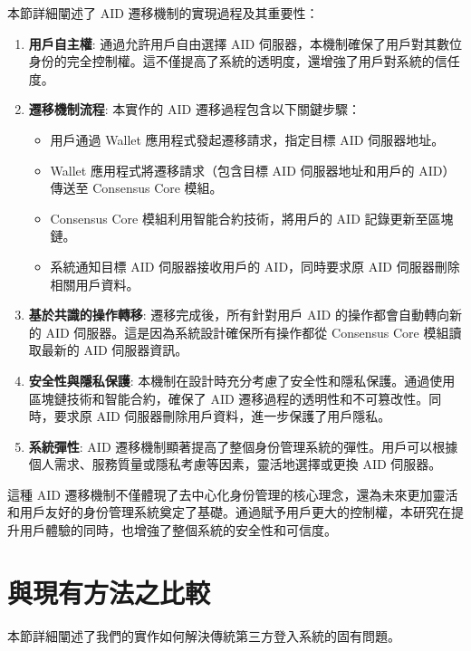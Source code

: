 本節詳細闡述了 AID 遷移機制的實現過程及其重要性：

\begin{enumerate}
  \item \textbf{用戶自主權}: 通過允許用戶自由選擇 AID 伺服器，本機制確保了用戶對其數位身份的完全控制權。這不僅提高了系統的透明度，還增強了用戶對系統的信任度。

  \item \textbf{遷移機制流程}: 本實作的 AID 遷移過程包含以下關鍵步驟：
        \begin{itemize}
          \item 用戶通過 Wallet 應用程式發起遷移請求，指定目標 AID 伺服器地址。
          \item Wallet 應用程式將遷移請求（包含目標 AID 伺服器地址和用戶的 AID）傳送至 Consensus Core 模組。
          \item Consensus Core 模組利用智能合約技術，將用戶的 AID 記錄更新至區塊鏈。
          \item 系統通知目標 AID 伺服器接收用戶的 AID，同時要求原 AID 伺服器刪除相關用戶資料。
        \end{itemize}

  \item \textbf{基於共識的操作轉移}: 遷移完成後，所有針對用戶 AID 的操作都會自動轉向新的 AID 伺服器。這是因為系統設計確保所有操作都從 Consensus Core 模組讀取最新的 AID 伺服器資訊。

  \item \textbf{安全性與隱私保護}: 本機制在設計時充分考慮了安全性和隱私保護。通過使用區塊鏈技術和智能合約，確保了 AID 遷移過程的透明性和不可篡改性。同時，要求原 AID 伺服器刪除用戶資料，進一步保護了用戶隱私。

  \item \textbf{系統彈性}: AID 遷移機制顯著提高了整個身份管理系統的彈性。用戶可以根據個人需求、服務質量或隱私考慮等因素，靈活地選擇或更換 AID 伺服器。
\end{enumerate}

這種 AID 遷移機制不僅體現了去中心化身份管理的核心理念，還為未來更加靈活和用戶友好的身份管理系統奠定了基礎。通過賦予用戶更大的控制權，本研究在提升用戶體驗的同時，也增強了整個系統的安全性和可信度。

\section{與現有方法之比較}

本節詳細闡述了我們的實作如何解決傳統第三方登入系統的固有問題。

